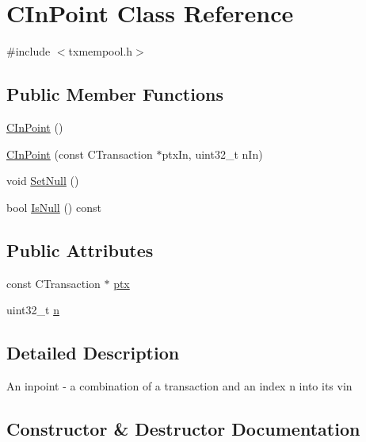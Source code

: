\hypertarget{class_c_in_point}{}\section{C\+In\+Point Class Reference}
\label{class_c_in_point}


{\ttfamily \#include $<$txmempool.\+h$>$}

\subsection*{Public Member Functions}
\begin{DoxyCompactItemize}
\item 
\hyperlink{class_c_in_point_ad44d4164a178cd7b0ddca6dd9f862d50}{C\+In\+Point} ()
\item 
\hyperlink{class_c_in_point_aa1aafd0f20137bcf79302bdb51ea2a0a}{C\+In\+Point} (const C\+Transaction $\ast$ptx\+In, uint32\+\_\+t n\+In)
\item 
void \hyperlink{class_c_in_point_af92945e76098bd920049f9f85a730e22}{Set\+Null} ()
\item 
bool \hyperlink{class_c_in_point_ab1f45ee1bda5013ccff208bf8d18d2ce}{Is\+Null} () const 
\end{DoxyCompactItemize}
\subsection*{Public Attributes}
\begin{DoxyCompactItemize}
\item 
const C\+Transaction $\ast$ \hyperlink{class_c_in_point_a76bf1c9b14d4ba95ff3e260cd47a9ce4}{ptx}
\item 
uint32\+\_\+t \hyperlink{class_c_in_point_a456e18a182bfa70cbf63d28561c3ae1c}{n}
\end{DoxyCompactItemize}


\subsection{Detailed Description}
An inpoint -\/ a combination of a transaction and an index n into its vin 

\subsection{Constructor \& Destructor Documentation}
\hypertarget{class_c_in_point_ad44d4164a178cd7b0ddca6dd9f862d50}{}
